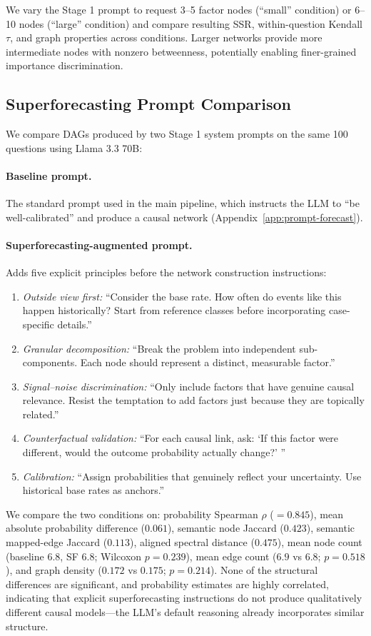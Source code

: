 \documentclass[11pt]{article}
\begin{document}
We vary the Stage 1 prompt to request 3--5 factor nodes (``small'' condition) or 6--10 nodes (``large'' condition) and compare resulting SSR, within-question Kendall $\tau$, and graph properties across conditions. Larger networks provide more intermediate nodes with nonzero betweenness, potentially enabling finer-grained importance discrimination.

\subsection{Superforecasting Prompt Comparison}

We compare DAGs produced by two Stage 1 system prompts on the same 100 questions using Llama 3.3 70B:

\paragraph{Baseline prompt.} The standard prompt used in the main pipeline, which instructs the LLM to ``be well-calibrated'' and produce a causal network (Appendix~\ref{app:prompt-forecast}).

\paragraph{Superforecasting-augmented prompt.} Adds five explicit principles before the network construction instructions:
\begin{enumerate}
\small
\item \textit{Outside view first:} ``Consider the base rate. How often do events like this happen historically? Start from reference classes before incorporating case-specific details.''
\item \textit{Granular decomposition:} ``Break the problem into independent sub-components. Each node should represent a distinct, measurable factor.''
\item \textit{Signal--noise discrimination:} ``Only include factors that have genuine causal relevance. Resist the temptation to add factors just because they are topically related.''
\item \textit{Counterfactual validation:} ``For each causal link, ask: `If this factor were different, would the outcome probability actually change?' ''
\item \textit{Calibration:} ``Assign probabilities that genuinely reflect your uncertainty. Use historical base rates as anchors.''
\end{enumerate}

We compare the two conditions on: probability Spearman $\rho$ ($= 0.845$), mean absolute probability difference ($0.061$), semantic node Jaccard ($0.423$), semantic mapped-edge Jaccard ($0.113$), aligned spectral distance ($0.475$), mean node count (baseline $6.8$, SF $6.8$; Wilcoxon $p = 0.239$), mean edge count ($6.9$ vs $6.8$; $p = 0.518$), and graph density ($0.172$ vs $0.175$; $p = 0.214$). None of the structural differences are significant, and probability estimates are highly correlated, indicating that explicit superforecasting instructions do not produce qualitatively different causal models---the LLM's default reasoning already incorporates similar structure.
\end{document}
